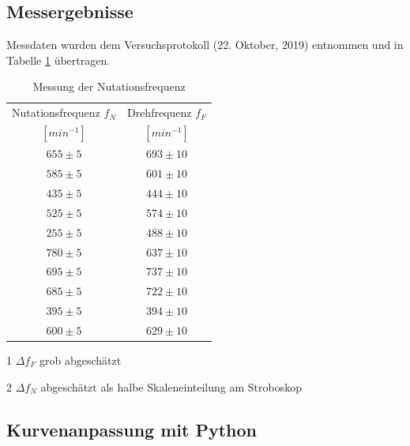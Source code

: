 \documentclass[a4paper,10pt]{article}
\begin{document}
\subsection{Messergebnisse}
Messdaten wurden dem Versuchsprotokoll (22. Oktober, 2019) entnommen und in Tabelle \ref{tab:Tab4} übertragen.
\unboldmath
\begin{table}[htb]
\centering
\caption{Messung der Nutationsfrequenz}\label{tab:Tab4}
\begin{threeparttable}
\begin{tabular}{cc}
\toprule
Nutationsfrequenz \boldmath\(f_N\)\unboldmath & Drehfrequenz \boldmath\(f_F\)\unboldmath \\
\([min^{-1}]\)&\([min^{-1}]\)\\
\midrule
\(655\pm5\)&\(693\pm10\)\\
\(585\pm5\)&\(601\pm10\)\\
\(435\pm5\)&\(444\pm10\)\\
\(525\pm5\)&\(574\pm10\)\\
\(255\pm5\)&\(488\pm10\)\\
\(780\pm5\)&\(637\pm10\)\\
\(695\pm5\)&\(737\pm10\)\\
\(685\pm5\)&\(722\pm10\)\\
\(395\pm5\)&\(394\pm10\)\\
\(600\pm5\)&\(629\pm10\)\\
  \bottomrule
 \end{tabular}
\begin{tablenotes}
\raggedright
\item[1] \boldmath\(\Delta f_F \) grob abgeschätzt\unboldmath
\item[2] \boldmath\(\Delta f_N \) abgeschätzt als halbe Skaleneinteilung am Stroboskop\unboldmath
\end{tablenotes}
\end{threeparttable}\end{table}
\boldmath

\subsection{Kurvenanpassung mit Python}
\end{document}
